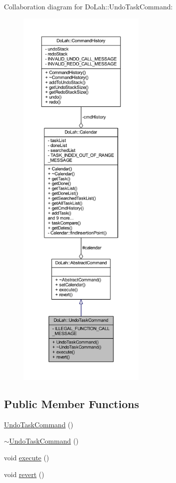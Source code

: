 Collaboration diagram for Do\+Lah\+:\+:Undo\+Task\+Command\+:\nopagebreak
\begin{figure}[H]
\begin{center}
\leavevmode
\includegraphics[height=550pt]{class_do_lah_1_1_undo_task_command__coll__graph}
\end{center}
\end{figure}
\subsection*{Public Member Functions}
\begin{DoxyCompactItemize}
\item 
\hyperlink{class_do_lah_1_1_undo_task_command_a71a86378ddc4c38fd15e800a81671e73}{Undo\+Task\+Command} ()
\item 
\hyperlink{class_do_lah_1_1_undo_task_command_aac83793e0582cec541c1e53c2b8fcb8e}{$\sim$\+Undo\+Task\+Command} ()
\item 
void \hyperlink{class_do_lah_1_1_undo_task_command_a3a4a747128048cafbfd5baa780642d6b}{execute} ()
\item 
void \hyperlink{class_do_lah_1_1_undo_task_command_abccc5882e346c4599601bbf24178cf23}{revert} ()
\end{DoxyCompactItemize}
